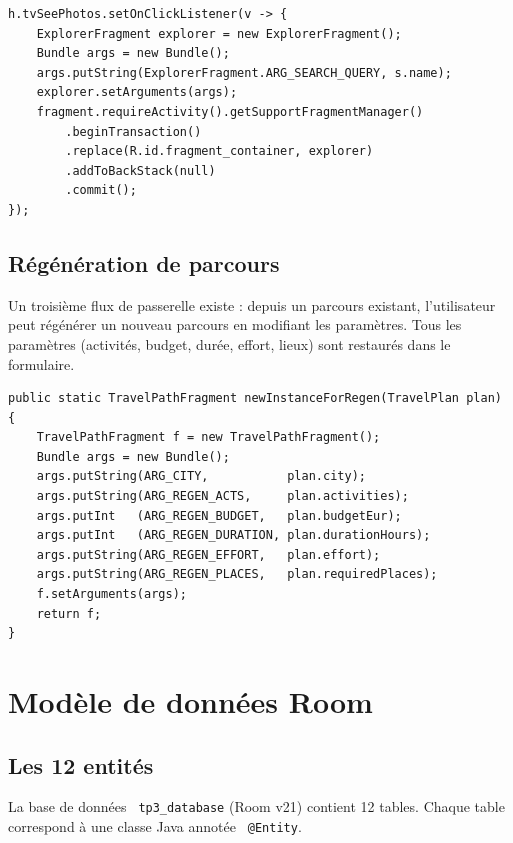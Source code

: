 \documentclass[a4paper,12pt,openany]{report}
\newcommand{\ic}[1]{\texttt{\small\colorbox{lightbg}{\color{navy!90} #1}}}
\begin{document}
\begin{lstlisting}
h.tvSeePhotos.setOnClickListener(v -> {
    ExplorerFragment explorer = new ExplorerFragment();
    Bundle args = new Bundle();
    args.putString(ExplorerFragment.ARG_SEARCH_QUERY, s.name);
    explorer.setArguments(args);
    fragment.requireActivity().getSupportFragmentManager()
        .beginTransaction()
        .replace(R.id.fragment_container, explorer)
        .addToBackStack(null)
        .commit();
});
\end{lstlisting}

\section{Régénération de parcours}

Un troisième flux de passerelle existe : depuis un parcours existant, l'utilisateur
peut régénérer un nouveau parcours en modifiant les paramètres. Tous les paramètres
(activités, budget, durée, effort, lieux) sont restaurés dans le formulaire.

\begin{lstlisting}
public static TravelPathFragment newInstanceForRegen(TravelPlan plan) {
    TravelPathFragment f = new TravelPathFragment();
    Bundle args = new Bundle();
    args.putString(ARG_CITY,           plan.city);
    args.putString(ARG_REGEN_ACTS,     plan.activities);
    args.putInt   (ARG_REGEN_BUDGET,   plan.budgetEur);
    args.putInt   (ARG_REGEN_DURATION, plan.durationHours);
    args.putString(ARG_REGEN_EFFORT,   plan.effort);
    args.putString(ARG_REGEN_PLACES,   plan.requiredPlaces);
    f.setArguments(args);
    return f;
}
\end{lstlisting}


\chapter{Modèle de données Room}

\section{Les 12 entités}

La base de données \ic{tp3\_database} (Room v21) contient 12 tables. Chaque table
correspond à une classe Java annotée \ic{@Entity}.
\end{document}
